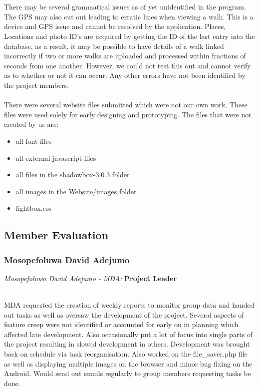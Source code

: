 \documentclass[12pt]{article}
\begin{document}
\\\\
There may be several grammatical issues as of yet unidentified in the program. The GPS may also cut out leading to erratic lines when viewing a walk. This is a device and GPS issue and cannot be resolved by the application. Places, Locations and photo ID's are acquired by getting the ID of the last entry into the database, as a result, it may be possible to have details of a walk linked incorrectly if two or more walks are uploaded and processed within fractions of seconds from one another. However, we could not test this out and cannot verify as to whether or not it can occur. Any other errors have not been identified by the project members.
\\\\
There were several website files submitted which were not our own work. These files were used solely for early designing and prototyping.
The files that were not created by us are:
\begin{itemize}
\item all font files
\item all external javascript files
\item all files in the shadowbox-3.0.3 folder
\item all images in the Website/images folder
\item lightbox.css
\end{itemize}
\newpage
\subsection{Member Evaluation}
\subsubsection{Mosopefoluwa David Adejumo}
\centerline{\emph{Mosopefoluwa David Adejumo - MDA:} \textbf{Project Leader}}
~\\
MDA requested the creation of weekly reports to monitor group data and handed out tasks as well as oversaw the development of the project. Several aspects of feature creep were not identified or accounted for early on in planning which affected late development. Also occasionally put a lot of focus into single parts of the project resulting in slowed development in others. Development was brought back on schedule via task reorganisation. Also worked on the file\_saver.php file as well as displaying multiple images on the browser and minor bug fixing on the Android. Would send out emails regularly to group members requesting tasks be done. 
\end{document}
